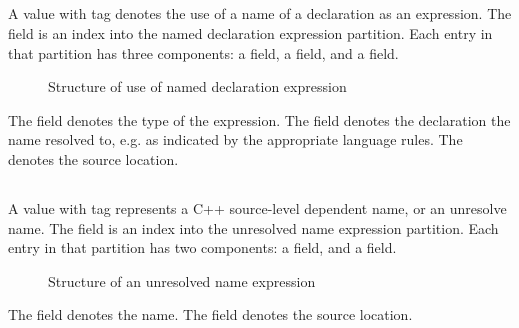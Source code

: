

\subsection{}
\label{sec:ifc:ExprSort:NamedDecl}

A  value with tag  denotes the use of a name of a declaration as an expression.
The  field is an index into the named declaration expression partition.
Each entry in that partition has three components: a  field, a  field, and a  field.
%
\begin{figure}[H]
	\centering
	\caption{Structure of use of named declaration expression}
	\label{fig:ifc-named-decl-expression-structure}
\end{figure}
%
The  field denotes the type of the expression.
The  field denotes the declaration the name resolved to, e.g. as indicated by the appropriate language rules.
The  denotes the source location.



\subsection{}
\label{sec:ifc:ExprSort:UnresolvedId}

A  value with tag  represents a C++ source-level dependent name, or an unresolve name.
The  field is an index into the unresolved name expression partition.
Each entry in that partition has two components: a  field, and a  field.
%
\begin{figure}[H]
	\centering
	\caption{Structure of an unresolved name expression}
	\label{fig:ifc-unresolved-name-expression-structure}
\end{figure}
%
The  field denotes the name.
The  field denotes the source location.

